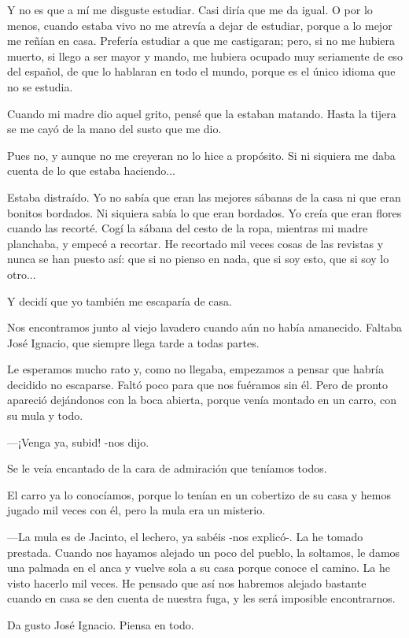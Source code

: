 \documentclass{barcodevapor3pags}
\begin{document}
Y no es que a mí me disguste estudiar. Casi diría que me da igual. O por
lo menos, cuando estaba vivo no me atrevía a dejar de estudiar, porque a
lo mejor me reñían en casa. Prefería estudiar a que me castigaran; pero,
si no me hubiera muerto, si llego a ser mayor y mando, me hubiera
ocupado muy seriamente de eso del español, de que lo hablaran en todo el
mundo, porque es el único idioma que no se estudia.~

Cuando mi madre dio aquel grito, pensé que la estaban matando. Hasta la
tijera se me cayó de la mano del susto que me dio.~

Pues no, y aunque no me creyeran no lo hice a propósito. Si ni siquiera
me daba cuenta de lo que estaba haciendo...~

Estaba distraído. Yo no sabía que eran las mejores sábanas de la casa ni
que eran bonitos bordados. Ni siquiera sabía lo que eran bordados. Yo
creía que eran flores cuando las recorté. Cogí la sábana del cesto de la
ropa, mientras mi madre planchaba, y empecé a recortar. He recortado mil
veces cosas de las revistas y nunca se han puesto así: que si no pienso
en nada, que si soy esto, que si soy lo otro...~

Y decidí que yo también me escaparía de casa.


\clearpage
\capitulo
{\Large N}os encontramos junto al viejo lavadero cuando aún no había amanecido.
Faltaba José Ignacio, que siempre llega tarde a todas partes.

Le esperamos mucho rato y, como no llegaba, empezamos a pensar que
habría decidido no escaparse. Faltó poco para que nos fuéramos sin él.
Pero de pronto apareció dejándonos con la boca abierta, porque venía
montado en un carro, con su mula y todo.~

---¡Venga ya, subid! -nos dijo.~

Se le veía encantado de la cara de admiración que teníamos todos.~

El carro ya lo conocíamos, porque lo tenían en un cobertizo de su casa y
hemos jugado mil veces con él, pero la mula era un misterio.~

---La mula es de Jacinto, el lechero, ya sabéis -nos explicó-. La he
tomado prestada. Cuando nos hayamos alejado un poco del pueblo, la
soltamos, le damos una palmada en el anca y vuelve sola a su casa porque
conoce el camino. La he visto hacerlo mil veces. He pensado que así nos
habremos alejado bastante cuando en casa se den cuenta de nuestra fuga,
y les será imposible encontrarnos.~

Da gusto José Ignacio. Piensa en todo.~
\end{document}
